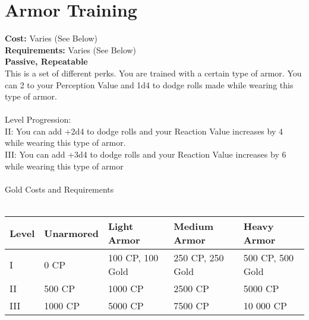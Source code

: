 \section{Armor Training}
\textbf{Cost:} Varies (See Below)\\
\textbf{Requirements:} Varies (See Below)\\
\textbf{Passive, Repeatable}\\
This is a set of different perks. You are trained with a certain type of armor. You can 2 to your Perception Value and 1d4 to dodge rolls made while wearing this type of armor.\\
\\
Level Progression:\\
II: You can add +2d4 to dodge rolls and your Reaction Value increases by 4 while wearing this type of armor.\\
III: You can add +3d4 to dodge rolls and your Reaction Value increases by 6 while wearing this type of armor\\
\\
Gold Costs and Requirements\\
\\
\begin{tabular}{l | p{2cm} | p{2.4cm} | p{2.6cm} | p{2.6cm}}
	Level & Unarmored & Light Armor & Medium Armor & Heavy Armor\\ \hline
	I & 0 CP & 100 CP, 100 Gold & 250 CP, 250 Gold & 500 CP, 500 Gold\\
	II & 500 CP& 1000 CP & 2500 CP & 5000 CP\\
	III & 1000 CP& 5000 CP & 7500 CP & 10 000 CP\\
\end{tabular}